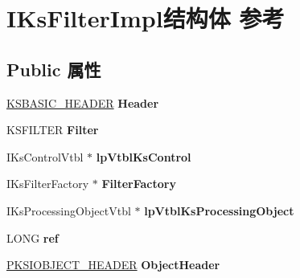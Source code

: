 \hypertarget{struct_i_ks_filter_impl}{}\section{I\+Ks\+Filter\+Impl结构体 参考}
\label{struct_i_ks_filter_impl}
\subsection*{Public 属性}
\begin{DoxyCompactItemize}
\item 
\mbox{\label{struct_i_ks_filter_impl_a7a0e83ad14bd16d2e7934f3f05fee1e3}} 
\hyperlink{struct_k_s_b_a_s_i_c___h_e_a_d_e_r}{K\+S\+B\+A\+S\+I\+C\+\_\+\+H\+E\+A\+D\+ER} {\bfseries Header}
\item 
\mbox{\label{struct_i_ks_filter_impl_a14a6959f9fdb86757d12942c18e67f94}} 
K\+S\+F\+I\+L\+T\+ER {\bfseries Filter}
\item 
\mbox{\label{struct_i_ks_filter_impl_afda616d57cd4464a66c2539dea73a23a}} 
I\+Ks\+Control\+Vtbl $\ast$ {\bfseries lp\+Vtbl\+Ks\+Control}
\item 
\mbox{\label{struct_i_ks_filter_impl_a5894f1a9d6e2e6e478e702bc1b9df9f7}} 
I\+Ks\+Filter\+Factory $\ast$ {\bfseries Filter\+Factory}
\item 
\mbox{\label{struct_i_ks_filter_impl_a7bafa8199df91db82e72944b9d2b458d}} 
I\+Ks\+Processing\+Object\+Vtbl $\ast$ {\bfseries lp\+Vtbl\+Ks\+Processing\+Object}
\item 
\mbox{\label{struct_i_ks_filter_impl_a3dd5398568d250ed7734581a83df4b14}} 
L\+O\+NG {\bfseries ref}
\item 
\mbox{\label{struct_i_ks_filter_impl_a2cea66eaa956b782d66c1db41404f8e0}} 
\hyperlink{struct_k_s_i_o_b_j_e_c_t___h_e_a_d_e_r}{P\+K\+S\+I\+O\+B\+J\+E\+C\+T\+\_\+\+H\+E\+A\+D\+ER} {\bfseries Object\+Header}
\item 
\mbox{\label{struct_i_ks_filter_impl_a108d41702b7dcd36b6a106201390d30b}} 

\end{DoxyCompactItemize}
